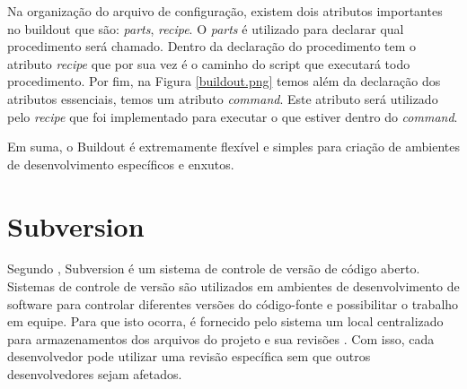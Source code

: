 Na organização do arquivo de configuração, existem dois atributos importantes no buildout que são: \textit{parts}, \textit{recipe}. O \textit{parts} é utilizado para declarar qual procedimento será chamado. Dentro da declaração do procedimento tem o atributo \textit{recipe} que por sua vez é o caminho do script que executará todo procedimento. Por fim, na Figura \ref{buildout.png} temos além da declaração dos atributos essenciais, temos um atributo \textit{command}. Este atributo será utilizado pelo \textit{recipe} que foi implementado para executar o que estiver dentro do \textit{command}.

Em suma, o Buildout é extremamente flexível e simples para criação de ambientes de desenvolvimento específicos e enxutos.
 
\section{Subversion}

Segundo \cite{975530}, Subversion é um sistema de controle de versão de código aberto. Sistemas de controle de versão são utilizados em ambientes de desenvolvimento de software para controlar diferentes versões do código-fonte e possibilitar o trabalho em equipe. Para que isto ocorra, é fornecido pelo sistema um local centralizado para armazenamentos dos arquivos do projeto e sua revisões \cite{1197991}. Com isso, cada desenvolvedor pode utilizar uma revisão específica sem que outros desenvolvedores sejam afetados.